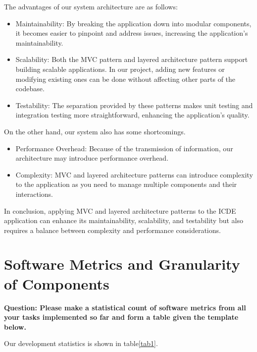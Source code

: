 \documentclass[conference]{IEEEtran}
\begin{document}
The advantages of our system architecture are as follows:

\begin{itemize}
    \item Maintainability: By breaking the application down into modular components, it becomes easier to pinpoint and address issues, increasing the application's maintainability.

    \item Scalability:  Both the MVC pattern and layered architecture pattern support building scalable applications. In our project, adding new features or modifying existing ones can be done without affecting other parts of the codebase.

    \item Testability: The separation provided by these patterns makes unit testing and integration testing more straightforward, enhancing the application's quality.

\end{itemize}

On the other hand, our system also has some shortcomings.

\begin{itemize}
    \item Performance Overhead: Because of the transmission of information, our architecture may introduce performance overhead.

    \item Complexity:  MVC and layered architecture patterns can introduce complexity to the application as you need to manage multiple components and their interactions.

\end{itemize}

In conclusion, applying MVC and layered architecture patterns to the ICDE application can enhance its maintainability, scalability, and testability but also requires a balance between complexity and performance considerations.


\section{\textbf{Software Metrics and Granularity of Components}}

\textbf{Question: Please make a statistical count of software metrics from all your tasks implemented so far and
form a table given the template below. }

Our development statistics is shown in table\ref{tab1}. 
\end{document}
